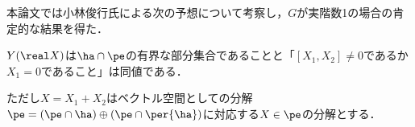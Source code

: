 本論文では小林俊行氏による次の予想について考察し，$G$が実階数1の場合の肯定的な結果を得た．
\begin{yosou*}
    $Y(\real X)$は$ \ha\cap \pe$の有界な部分集合であることと「$   [X_1, X_2]\neq 0 $であるか$X_1 = 0$であること」は同値である．

  ただし$X = X_1 + X_2 $はベクトル空間としての分解$\pe =(\pe\cap \ha)\oplus(\pe\cap\per{\ha}) $に対応する$X\in \pe$の分解とする．
\end{yosou*}

